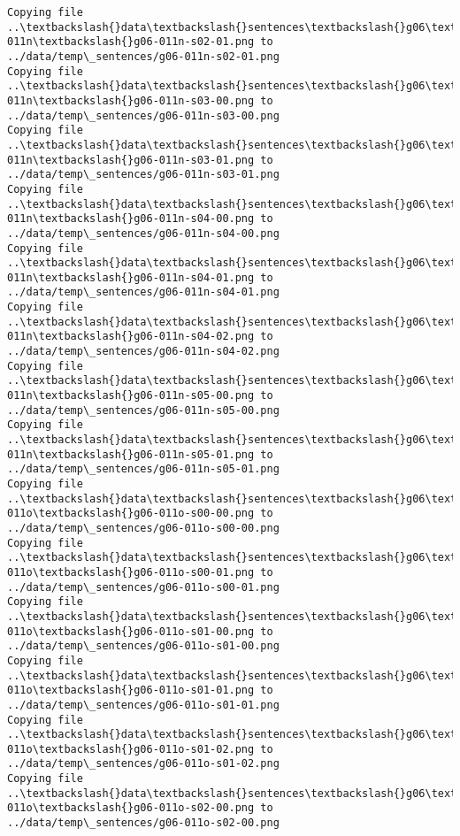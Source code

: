 \documentclass[11pt]{article}
\begin{document}
\begin{Verbatim}[commandchars=\\\{\}]
Copying file ..\textbackslash{}data\textbackslash{}sentences\textbackslash{}g06\textbackslash{}g06-011n\textbackslash{}g06-011n-s02-01.png to
../data/temp\_sentences/g06-011n-s02-01.png
Copying file ..\textbackslash{}data\textbackslash{}sentences\textbackslash{}g06\textbackslash{}g06-011n\textbackslash{}g06-011n-s03-00.png to
../data/temp\_sentences/g06-011n-s03-00.png
Copying file ..\textbackslash{}data\textbackslash{}sentences\textbackslash{}g06\textbackslash{}g06-011n\textbackslash{}g06-011n-s03-01.png to
../data/temp\_sentences/g06-011n-s03-01.png
Copying file ..\textbackslash{}data\textbackslash{}sentences\textbackslash{}g06\textbackslash{}g06-011n\textbackslash{}g06-011n-s04-00.png to
../data/temp\_sentences/g06-011n-s04-00.png
Copying file ..\textbackslash{}data\textbackslash{}sentences\textbackslash{}g06\textbackslash{}g06-011n\textbackslash{}g06-011n-s04-01.png to
../data/temp\_sentences/g06-011n-s04-01.png
Copying file ..\textbackslash{}data\textbackslash{}sentences\textbackslash{}g06\textbackslash{}g06-011n\textbackslash{}g06-011n-s04-02.png to
../data/temp\_sentences/g06-011n-s04-02.png
Copying file ..\textbackslash{}data\textbackslash{}sentences\textbackslash{}g06\textbackslash{}g06-011n\textbackslash{}g06-011n-s05-00.png to
../data/temp\_sentences/g06-011n-s05-00.png
Copying file ..\textbackslash{}data\textbackslash{}sentences\textbackslash{}g06\textbackslash{}g06-011n\textbackslash{}g06-011n-s05-01.png to
../data/temp\_sentences/g06-011n-s05-01.png
Copying file ..\textbackslash{}data\textbackslash{}sentences\textbackslash{}g06\textbackslash{}g06-011o\textbackslash{}g06-011o-s00-00.png to
../data/temp\_sentences/g06-011o-s00-00.png
Copying file ..\textbackslash{}data\textbackslash{}sentences\textbackslash{}g06\textbackslash{}g06-011o\textbackslash{}g06-011o-s00-01.png to
../data/temp\_sentences/g06-011o-s00-01.png
Copying file ..\textbackslash{}data\textbackslash{}sentences\textbackslash{}g06\textbackslash{}g06-011o\textbackslash{}g06-011o-s01-00.png to
../data/temp\_sentences/g06-011o-s01-00.png
Copying file ..\textbackslash{}data\textbackslash{}sentences\textbackslash{}g06\textbackslash{}g06-011o\textbackslash{}g06-011o-s01-01.png to
../data/temp\_sentences/g06-011o-s01-01.png
Copying file ..\textbackslash{}data\textbackslash{}sentences\textbackslash{}g06\textbackslash{}g06-011o\textbackslash{}g06-011o-s01-02.png to
../data/temp\_sentences/g06-011o-s01-02.png
Copying file ..\textbackslash{}data\textbackslash{}sentences\textbackslash{}g06\textbackslash{}g06-011o\textbackslash{}g06-011o-s02-00.png to
../data/temp\_sentences/g06-011o-s02-00.png

\end{Verbatim}
\end{document}
